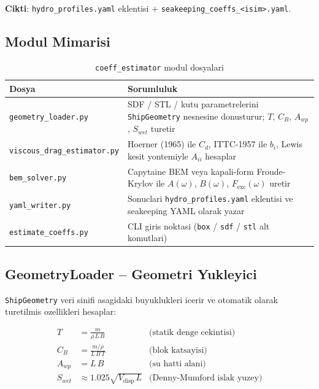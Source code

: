 \documentclass[12pt,a4paper]{article}
\begin{document}
\textbf{Cikti}: \texttt{hydro\_profiles.yaml} eklentisi +
\texttt{seakeeping\_coeffs\_<isim>.yaml}.

\subsection{Modul Mimarisi}

\begin{table}[H]
  \centering
  \caption{\texttt{coeff\_estimator} modul dosyalari}
  \begin{tabularx}{\linewidth}{lX}
    \toprule
    \textbf{Dosya} & \textbf{Sorumluluk} \\
    \midrule
    \texttt{geometry\_loader.py}       & SDF / STL / kutu parametrelerini \texttt{ShipGeometry} nesnesine donusturur; $T$, $C_B$, $A_{wp}$, $S_{wet}$ turetir \\
    \texttt{viscous\_drag\_estimator.py} & Hoerner (1965) ile $C_d$, ITTC-1957 ile $b_i$, Lewis kesit yontemiyle $A_{ii}$ hesaplar \\
    \texttt{bem\_solver.py}            & Capytaine BEM veya kapali-form Froude-Krylov ile $A(\omega)$, $B(\omega)$, $F_{\text{exc}}(\omega)$ uretir \\
    \texttt{yaml\_writer.py}           & Sonuclari \texttt{hydro\_profiles.yaml} eklentisi ve seakeeping YAML olarak yazar \\
    \texttt{estimate\_coeffs.py}       & CLI giris noktasi (\texttt{box} / \texttt{sdf} / \texttt{stl} alt komutlari) \\
    \bottomrule
  \end{tabularx}
\end{table}

\subsection{GeometryLoader -- Geometri Yukleyici}

\texttt{ShipGeometry} veri sinifi asagidaki buyuklukleri icerir ve otomatik
olarak turetilmis ozellikleri hesaplar:

\begin{align}
  T &= \frac{m}{\rho\,L\,B}
  \label{eq:draft_calc}
  &\text{(statik denge cekintisi)} \\[4pt]
  C_B &= \frac{m/\rho}{L\,B\,T}
  \label{eq:cb_calc}
  &\text{(blok katsayisi)} \\[4pt]
  A_{wp} &= L\,B
  \label{eq:awp_calc}
  &\text{(su hatti alani)} \\[4pt]
  S_{wet} &\approx 1.025\sqrt{V_{\text{disp}}\,L}
  \label{eq:swet_calc}
  &\text{(Denny-Mumford islak yuzey)}
\end{align}
\end{document}
